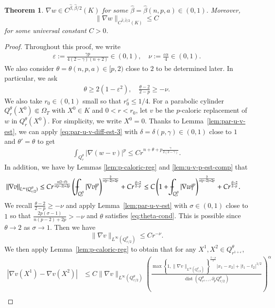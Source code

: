 \documentclass[11pt,oneside,english]{amsart}
\newcommand{\e}{\varepsilon}
\newcommand{\al}{\alpha}
\newcommand{\be}{\beta}
\newcommand{\de}{\delta}
\newcommand{\dist}{\operatorname{dist}}
\newcommand{\D}{\nabla}
\numberwithin{equation}{section}
\def\Xint#1{\mathchoice
  {\XXint\displaystyle\textstyle{#1}}%
  {\XXint\textstyle\scriptstyle{#1}}%
  {\XXint\scriptstyle\scriptscriptstyle{#1}}%
  {\XXint\scriptscriptstyle\scriptscriptstyle{#1}}%
  \!\int}
\def\XXint#1#2#3{{\setbox0=\hbox{$#1{#2#3}{\int}$}
    \vcenter{\hbox{$#2#3$}}\kern-.5\wd0}}
\def\dashint{\Xint-}
\newtheorem{theorem}{Theorem}
\theoremstyle{plain}
\numberwithin{equation}{section}
\begin{document}
\begin{theorem}
   $\D w\in C^{\hat\be,\hat\be/2}(K)$ for some $\hat\be=\hat\be(n,p,a)\in(0,1)$. Moreover, 
  $$
  \|\D w\|_{C^{\hat\be,\hat\be/2}(K)}\le C
  $$
  for some universal constant $C>0$.
\end{theorem}

\begin{proof}
Throughout this proof, we write
\begin{align*}
    \e:=\frac{\gamma p}{4(2-\gamma)(n+2)}\in (0,1),\quad \nu:=\frac{\e\al}4\in (0,1).
\end{align*}
We also consider $\theta=\theta(n,p,a)\in[p,2)$ close to $2$ to be determined later. In particular, we ask
\begin{align}
    \label{eq:theta-cond}
    \theta\ge 2(1-\e^2),\quad \frac{\theta-2}{2-p}\ge-\nu.
\end{align}
We also take $r_0\in(0,1)$ small so that $r_0^\e\le 1/4$. For a parabolic cylinder $Q_r^\theta(X^0)\Subset \Omega_T$ with $X^0\in K$ and $0<r<r_0$, let $v$ be the $p$-caloric replacement of $w$ in $Q_r^\theta(X^0)$. For simplicity, we write $X^0=0$. Thanks to Lemma~\ref{lem:par-u-v-est}, we can apply \eqref{eq:par-u-v-diff-est-3} with $\de=\de(p,\gamma)\in(0,1)$ close to $1$ and $\theta'=\theta$ to get
\begin{align}
    \label{eq:par-u-v-diff-est-4}
    \int_{Q_r^\theta}|\D(w-v)|^p\le Cr^{n+\theta+p\frac{\gamma}{2(2-\gamma)}}.
\end{align}
In addition, we have by Lemmas \ref{lem:p-caloric-reg} and \ref{lem:u-v-p-est-comp} that
\begin{align*}
    \|\D v\|_{L^\infty(Q^\theta_{r/2})}&\le Cr^{\frac{n(2-\theta)}{n(p-2)+2p}}\left(\dashint_{Q_r^\theta}|\D v|^p\right)^{\frac2{n(p-2)+2p}}+Cr^{\frac{\theta-2}{2-p}}\le C\left(1+\dashint_{Q_r^\theta}|\D w|^p \right)^{\frac2{n(p-2)+2p}}+Cr^{\frac{\theta-2}{2-p}}.
\end{align*}
We recall $\frac{\theta-2}{2-p}\ge -\nu$ and apply Lemma~\ref{lem:par-u-v-est} with $\sigma\in(0,1)$ close to $1$ so that $\frac{2p(\sigma-1)}{n(p-2)+2p}>-\nu$ and $\theta$ satisfies \eqref{eq:theta-cond}. This is possible since $\theta\to 2$ as $\sigma\to1$. Then we have
$$
\|\D v\|_{L^\infty(Q^\theta_{r/2})}\le Cr^{-\nu}.
$$
We then apply Lemma~\ref{lem:p-caloric-reg} to obtain that for any $X^1,X^2\in Q^\theta_{r^{1+\e}}$,
\begin{align*}
    |\D v(X^1)-\D v(X^2)|&\le C\|\D v\|_{L^\infty(Q_{r/2}^\theta)}\left(\frac{\max\left\{1,\|\D v\|_{L^\infty(Q_{r/2}^\theta)}\right\}^{\frac{2-p}2}|x_1-x_2|+|t_1-t_2|^{1/2} }{\dist(Q^\theta_{r^{1+\e}},\partial_pQ_{r/2}^\theta) } \right)^\al\\

\end{align*}
\end{proof}
\end{document}
